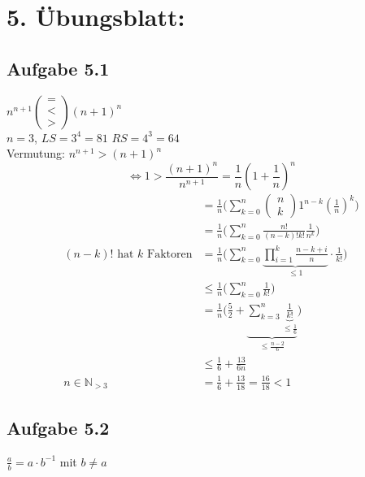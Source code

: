 \section{5. Übungsblatt:}

\subsection{Aufgabe 5.1}

$n^{n+1}
\begin{pmatrix}
= \\
< \\
>
\end{pmatrix}
(n+1)^n$\\

$n=3$, $LS=3^4=81$ $RS=4^3=64$\\

Vermutung: $n^{n+1}>(n+1)^n$\\

\begin{equation*}
\Leftrightarrow1>\frac{(n+1)^n}{n^{n+1}}=\frac{1}{n}(1+\frac{1}{n})^n
\end{equation*}
\begin{align*}
&=\frac{1}{n}\Bigg(\sum_{k=0}^n
\begin{pmatrix}
n \\
k
\end{pmatrix}
1^{n-k}
(\frac{1}{n})^k
\Bigg)\\
&=\frac{1}{n}\Bigg(\sum_{k=0}^n\frac{n!}{(n-k)!k!}\frac{1}{n^k}\Bigg)\\
(n-k)!\mbox{ hat }k\mbox{ Faktoren}&=\frac{1}{n}\Bigg(\sum_{k=0}^n
\underset{\leq 1}{\underbrace{\prod_{i=1}^k\frac{n-k+i}{n}}}\cdot\frac{1}{k!}\Bigg)\\
&\leq\frac{1}{n}\Bigg(\sum_{k=0}^n\frac{1}{k!}\Bigg)\\
&=\frac{1}{n}\Bigg(\frac{5}{2}+\underset{\leq\frac{n-2}{6}}{\underbrace{\sum_{k=3}^n\underset{\leq\frac{1}{6}}{\underbrace{\frac{1}{k!}}}}}\Bigg)\\
&\leq\frac{1}{6}+\frac{13}{6n}\\
n\in\mathbb{N}_{>3}&=\frac{1}{6}+\frac{13}{18}=\frac{16}{18}<1
\end{align*}

\newpage

\subsection{Aufgabe 5.2}

$\frac{a}{b}=a\cdot b^{-1}$ mit $b\neq a$

